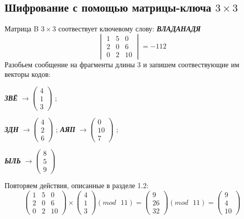 \documentclass[a5paper, 10pt]{article}
\theoremstyle{definition}
\theoremstyle{plain}
\theoremstyle{remark}
\begin{document}
\subsection{Шифрование с помощью матрицы-ключа $3 \times 3$}
Матрица B $3 \times 3$ соотвествует ключевому слову: \textbf{\textit{ВЛАДАНАДЯ}}
\begin{equation}
\begin{vmatrix}
 1 & 5 & 0\\
 2 & 0 & 6 \\
 0 & 2 & 10
\end{vmatrix}
 = -112
\end{equation}
Разобьем сообщение на фрагменты длины 3 и запишем соотвествующие им векторы кодов:
\begin{center}
\textbf{\textit{ЗВЁ}} $\to \begin{pmatrix}
 4\\
1\\
3
\end{pmatrix}$ ;

\textbf{\textit{ЗДН}}  $\to \begin{pmatrix}
4\\
 2\\
6
\end{pmatrix}$ ;
\textbf{\textit{АЯП}}  $\to \begin{pmatrix}
 0\\
10\\
7
\end{pmatrix}$ ;

\textbf{\textit{ЫЛЬ}}  $\to \begin{pmatrix}
8\\
 5\\
9
\end{pmatrix}$ \\
\end{center}
Повторяем действия, описанные в разделе 1.2:
\begin{equation}
\begin{pmatrix}
 1 & 5 & 0\\
 2 & 0 & 6\\
0 & 2 & 10
\end{pmatrix}
 \times
\begin{pmatrix}
 4\\
1\\
3
\end{pmatrix}
(mod \text{ }11)
= 
\begin{pmatrix}
 9\\
26\\
32
\end{pmatrix}
(mod \text{ }11)
= \begin{pmatrix}
9 \\
4\\
10
\end{pmatrix}
\end{equation}
\end{document}

